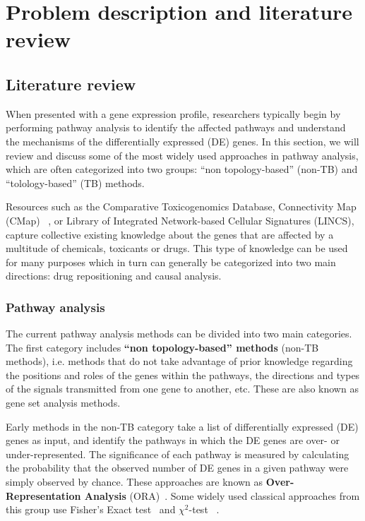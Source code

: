 \section{Problem description and literature review}



\subsection{Literature review}


When presented with a gene expression profile, researchers typically begin by performing pathway analysis to identify the affected pathways and understand the mechanisms of the differentially expressed (DE) genes. In this section, we will review and discuss some of the most widely used approaches in pathway analysis, which are often categorized into two groups: ``non topology-based''  (non-TB) and ``tolology-based'' (TB) methods.

Resources such as the Comparative Toxicogenomics Database, Connectivity Map (CMap) ~\cite{lamb2007connectivity, lamb2006connectivity}, or Library of Integrated Network-based Cellular Signatures (LINCS), capture collective existing knowledge about the genes that are affected by a multitude of  chemicals, toxicants or drugs. This type of knowledge can be used for many purposes which in turn can generally be categorized into two main directions: drug repositioning and causal analysis.



\subsubsection{Pathway analysis}
The current pathway analysis methods can be divided into two main categories. 
The first category includes \textbf{``non topology-based'' methods} (non-TB methods), i.e. methods  that do not take advantage of prior knowledge regarding the positions and roles of the genes within the pathways, the directions and types of the signals transmitted from one gene to another, etc.  
These are also known as gene set analysis methods. 

Early methods in the non-TB category take a list of differentially expressed (DE) genes as input, and identify the pathways in which the DE genes are over- or under-represented.
The significance of each pathway is measured by calculating the probability that the observed number of DE genes in a given pathway were simply observed by chance. 
These approaches are known as \textbf{Over-Representation Analysis} (ORA)~\cite{khatri2005comparison, goeman2007analyzing}.
Some widely used classical approaches from this group use Fisher's Exact test~\cite{Fisher:1951} and $\chi^2$-test ~\cite{Fisher:1993}. 


